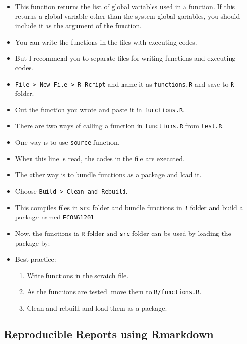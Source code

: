 \documentclass[
]{book}
\providecommand{\tightlist}{%
  \setlength{\itemsep}{0pt}\setlength{\parskip}{0pt}}
\begin{document}
\begin{itemize}
\item
  This function returns the list of global variables used in a function. If this returns a global variable other than the system global gariables, you should include it as the argument of the function.
\item
  You can write the functions in the files with executing codes.
\item
  But I recommend you to separate files for writing functions and executing codes.
\item
  \texttt{File\ \textgreater{}\ New\ File\ \textgreater{}\ R\ Rcript} and name it as \texttt{functions.R} and save to \texttt{R} folder.
\item
  Cut the function you wrote and paste it in \texttt{functions.R}.
\item
  There are two ways of calling a function in \texttt{functions.R} from \texttt{test.R}.
\item
  One way is to use \texttt{source} function.
\item
  When this line is read, the codes in the file are executed.
\item
  The other way is to bundle functions as a package and load it.
\item
  Choose \texttt{Build\ \textgreater{}\ Clean\ and\ Rebuild}.
\item
  This compiles files in \texttt{src} folder and bundle functions in \texttt{R} folder and build a package named \texttt{ECON6120I}.
\item
  Now, the functions in \texttt{R} folder and \texttt{src} folder can be used by loading the package by:
\item
  Best practice:

  \begin{enumerate}
  \def\labelenumi{\arabic{enumi}.}
  \tightlist
  \item
    Write functions in the scratch file.
  \item
    As the functions are tested, move them to \texttt{R/functions.R}.
  \item
    Clean and rebuild and load them as a package.
  \end{enumerate}
\end{itemize}

\hypertarget{reproducible-reports-using-rmarkdown}{%
\subsection{Reproducible Reports using Rmarkdown}\label{reproducible-reports-using-rmarkdown}}
\end{document}
